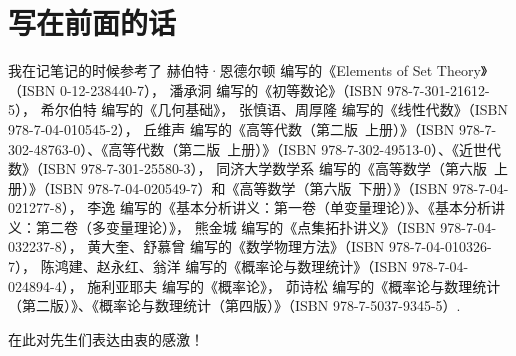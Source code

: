 \documentclass[UTF8,12pt]{ctexbook}
\title{\pdftitle}
\author{\pdfauthor}
\date{
Powered by \TeX \\
\today
}
\begin{document}


\chapter*{写在前面的话}
我在记笔记的时候参考了%
赫伯特·恩德尔顿 编写的《Elements of Set Theory》（ISBN 0-12-238440-7），%
潘承洞 编写的《初等数论》（ISBN 978-7-301-21612-5），%
希尔伯特 编写的《几何基础》，%
张慎语、周厚隆 编写的《线性代数》（ISBN 978-7-04-010545-2），%
丘维声 编写的《高等代数（第二版\ 上册）》（ISBN 978-7-302-48763-0）、《高等代数（第二版\ 上册）》（ISBN 978-7-302-49513-0）、《近世代数》（ISBN 978-7-301-25580-3），%
同济大学数学系 编写的《高等数学（第六版\ 上册）》（ISBN 978-7-04-020549-7）和《高等数学（第六版\ 下册）》（ISBN 978-7-04-021277-8），%
李逸 编写的《基本分析讲义：第一卷（单变量理论）》、《基本分析讲义：第二卷（多变量理论）》，%
熊金城 编写的《点集拓扑讲义》（ISBN 978-7-04-032237-8），%
黄大奎、舒慕曾 编写的《数学物理方法》（ISBN 978-7-04-010326-7），%
陈鸿建、赵永红、翁洋 编写的《概率论与数理统计》（ISBN 978-7-04-024894-4），%
施利亚耶夫 编写的《概率论》，%
茆诗松 编写的《概率论与数理统计（第二版）》、《概率论与数理统计（第四版）》（ISBN 978-7-5037-9345-5）.

在此对先生们表达由衷的感激！

\frontmatter
{} %
\tableofcontents

\mainmatter
{} %

\let\oldchapter\chapter
\renewcommand\chapter{\cleardoublepage\oldchapter}
\let\oldsection\section
\renewcommand\section{\clearpage\oldsection}

\everymath{\displaystyle}

\renewcommand{\v}[3][1]{%
\begingroup%
\ifnum0<0#3\relax{%
  \setcounter{enumi}{#1}%
  {#2}_{\theenumi}%
  \stepcounter{enumi}%
  \whileboolexpr{not test{\ifnumcomp{\value{enumi}}>{#3}}}%
  {%
    ,\allowbreak{#2}_{\theenumi}%
    \stepcounter{enumi}%
  }%
}\else%
  \ifx#30\relax%
    {#2}_{#1},\allowbreak{#2}_{\number\numexpr#1+1},\allowbreak\dotsc
  \else
    {#2}_{#1},\allowbreak{#2}_{\number\numexpr#1+1},\allowbreak\dotsc,\allowbreak{#2}_{#3}%
  \fi
\fi\endgroup%
}%










\backmatter

\end{document}
